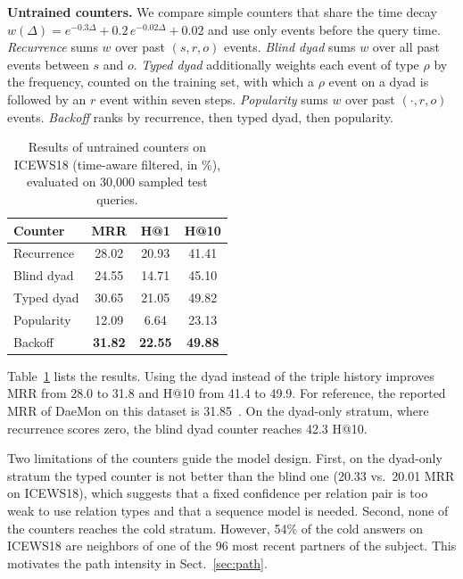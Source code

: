\documentclass[runningheads]{llncs}
\makeatletter
\newcommand{\hone}{H@1}
\newcommand{\hten}{H@10}
\newcommand{\para}[1]{\smallskip\noindent\textbf{#1}}
\makeatother
\begin{document}
\para{Untrained counters.} We compare simple counters that share the time decay $w(\Delta) = e^{-0.3\Delta} + 0.2\,e^{-0.02\Delta} + 0.02$ and use only events before the query time. \emph{Recurrence} sums $w$ over past $(s, r, o)$ events. \emph{Blind dyad} sums $w$ over all past events between $s$ and $o$. \emph{Typed dyad} additionally weights each event of type $\rho$ by the frequency, counted on the training set, with which a $\rho$ event on a dyad is followed by an $r$ event within seven steps. \emph{Popularity} sums $w$ over past $(\cdot, r, o)$ events. \emph{Backoff} ranks by recurrence, then typed dyad, then popularity.

\begin{table}[t]
  \centering
  \caption{Results of untrained counters on ICEWS18 (time-aware filtered, in \%), evaluated on 30,000 sampled test queries.}
  \label{tab:diag}
  \setlength{\tabcolsep}{8pt}
  \begin{tabular}{l ccc}
    \toprule
    Counter & MRR & \hone{} & \hten{} \\
    \midrule
    Recurrence & 28.02 & 20.93 & 41.41 \\
    Blind dyad & 24.55 & 14.71 & 45.10 \\
    Typed dyad & 30.65 & 21.05 & 49.82 \\
    Popularity & 12.09 &  6.64 & 23.13 \\
    Backoff    & \textbf{31.82} & \textbf{22.55} & \textbf{49.88} \\
    \bottomrule
  \end{tabular}
\end{table}

Table~\ref{tab:diag} lists the results. Using the dyad instead of the triple history improves MRR from 28.0 to 31.8 and \hten{} from 41.4 to 49.9. For reference, the reported MRR of DaeMon on this dataset is 31.85~\cite{dong2025dimnet}. On the dyad-only stratum, where recurrence scores zero, the blind dyad counter reaches 42.3 \hten{}.

Two limitations of the counters guide the model design. First, on the dyad-only stratum the typed counter is not better than the blind one (20.33 vs.\ 20.01 MRR on ICEWS18), which suggests that a fixed confidence per relation pair is too weak to use relation types and that a sequence model is needed. Second, none of the counters reaches the cold stratum. However, 54\% of the cold answers on ICEWS18 are neighbors of one of the 96 most recent partners of the subject. This motivates the path intensity in Sect.~\ref{sec:path}.
\end{document}
